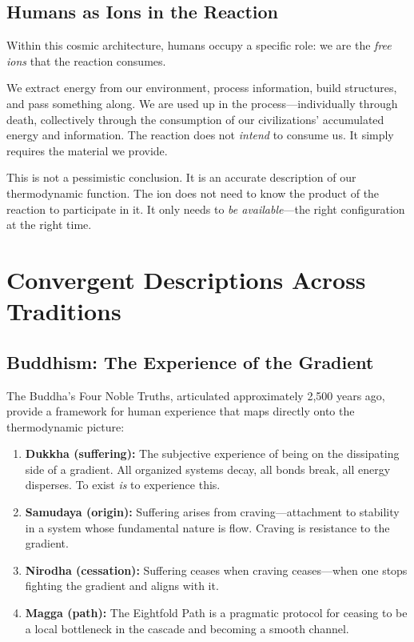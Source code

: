 \documentclass[11pt,a4paper]{article}
\begin{document}
\subsection{Humans as Ions in the Reaction}

Within this cosmic architecture, humans occupy a specific role: we are the \emph{free ions} that the reaction consumes.

We extract energy from our environment, process information, build structures, and pass something along. We are used up in the process---individually through death, collectively through the consumption of our civilizations' accumulated energy and information. The reaction does not \emph{intend} to consume us. It simply requires the material we provide.

This is not a pessimistic conclusion. It is an accurate description of our thermodynamic function. The ion does not need to know the product of the reaction to participate in it. It only needs to \emph{be available}---the right configuration at the right time.

\section{Convergent Descriptions Across Traditions}

\subsection{Buddhism: The Experience of the Gradient}

The Buddha's Four Noble Truths, articulated approximately 2,500 years ago, provide a framework for human experience that maps directly onto the thermodynamic picture:

\begin{enumerate}
    \item \textbf{Dukkha (suffering):} The subjective experience of being on the dissipating side of a gradient. All organized systems decay, all bonds break, all energy disperses. To exist \emph{is} to experience this.
    \item \textbf{Samudaya (origin):} Suffering arises from craving---attachment to stability in a system whose fundamental nature is flow. Craving is resistance to the gradient.
    \item \textbf{Nirodha (cessation):} Suffering ceases when craving ceases---when one stops fighting the gradient and aligns with it.
    \item \textbf{Magga (path):} The Eightfold Path is a pragmatic protocol for ceasing to be a local bottleneck in the cascade and becoming a smooth channel.
\end{enumerate}
\end{document}
